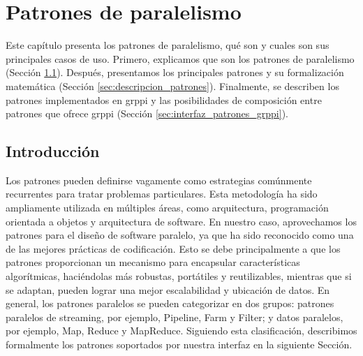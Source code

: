 \chead[]{}
\renewcommand{\headrulewidth}{0.5pt}

\lfoot[]{}
\cfoot[]{}
\rfoot[]{}
\renewcommand{\footrulewidth}{0pt}

\chapter{Patrones de paralelismo}
\label{ch:patrones_paralelismo}

Este capítulo presenta los patrones de paralelismo, qué son y cuales son sus principales casos de uso. Primero, explicamos que son los patrones de paralelismo (Sección \ref{sec:patrones_paralelismo_introduccion}). Después, presentamos los principales patrones y su formalización matemática (Sección \ref{sec:descripcion_patrones}). Finalmente, se describen los patrones implementados en \acrshort{grppi} y las posibilidades de composición entre patrones que ofrece \acrshort{grppi} (Sección \ref{sec:interfaz_patrones_grppi}). 

\section{Introducción}
\label{sec:patrones_paralelismo_introduccion}

Los patrones pueden definirse vagamente como estrategias comúnmente recurrentes para tratar problemas particulares. Esta metodología ha sido ampliamente utilizada en múltiples áreas, como arquitectura, programación orientada a objetos y arquitectura de software. En nuestro caso, aprovechamos los patrones para el diseño de software paralelo, ya que ha sido reconocido como una de las mejores prácticas de codificación. Esto se debe principalmente a que los patrones proporcionan un mecanismo para encapsular características algorítmicas, haciéndolas más robustas, portátiles y reutilizables, mientras que si se adaptan, pueden lograr una mejor escalabilidad y ubicación de datos. En general, los patrones paralelos se pueden categorizar en dos grupos: patrones paralelos de streaming, por ejemplo, Pipeline, Farm y Filter; y datos paralelos, por ejemplo, Map, Reduce y MapReduce. Siguiendo esta clasificación, describimos formalmente los patrones soportados por nuestra interfaz en la siguiente Sección.


